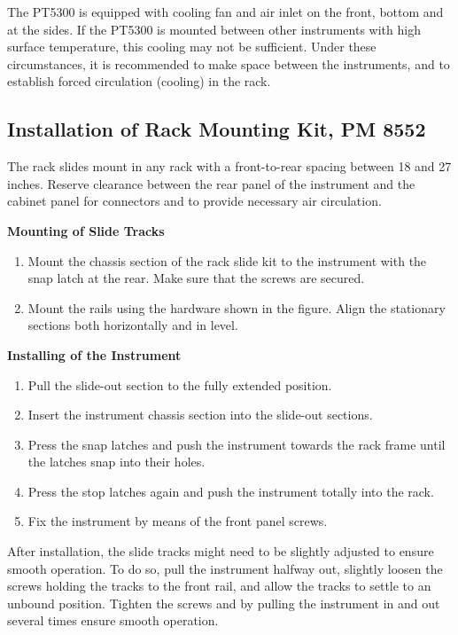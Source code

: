 The PT5300 is equipped with cooling fan and air inlet on the front, bottom and at the sides.
If the PT5300 is mounted between other instruments with high surface temperature, this cooling may not be sufficient. Under these circumstances, it is recommended to make space between the instruments, and to establish forced circulation (cooling) in the rack.

\subsection{Installation of Rack Mounting Kit, PM 8552}
The rack slides mount in any rack with a front-to-rear spacing between 18 and 27 inches.
Reserve clearance between the rear panel of the instrument and the cabinet panel for
connectors and to provide necessary air circulation.

\textbf{Mounting of Slide Tracks}
\begin{enumerate}
\item Mount the chassis section of the rack slide kit to the instrument with the snap latch at the rear. Make sure that the screws are secured.
\item Mount the rails using the hardware shown in the figure. Align the stationary sections both horizontally and in level.
\end{enumerate}

\textbf{Installing of the Instrument}
\begin{enumerate}
\item Pull the slide-out section to the fully extended position.
\item Insert the instrument chassis section into the slide-out sections.
\item Press the snap latches and push the instrument towards the rack frame until the latches snap into their holes.
\item Press the stop latches again and push the instrument totally into the rack.
\item Fix the instrument by means of the front panel screws.
\end{enumerate}

After installation, the slide tracks might need to be slightly adjusted to ensure smooth operation.
To do so, pull the instrument halfway out, slightly loosen the screws holding the tracks to the front rail, and allow the tracks to settle to an unbound position. Tighten the screws and by pulling the instrument in and out several times ensure smooth operation.


